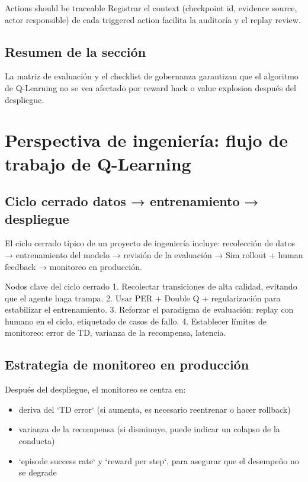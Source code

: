 \documentclass[a4paper]{article}
\begin{document}
\begin{knowledgebox}{Actions should be traceable}
Registrar el context (checkpoint id, evidence source, actor responsible) de cada triggered action facilita la auditoría y el replay review.
\end{knowledgebox}

\subsection{Resumen de la sección}

La matriz de evaluación y el checklist de gobernanza garantizan que el algoritmo de Q-Learning no se vea afectado por reward hack o value explosion después del despliegue.
\section{Perspectiva de ingeniería: flujo de trabajo de Q-Learning}

\subsection{Ciclo cerrado datos → entrenamiento → despliegue}

El ciclo cerrado típico de un proyecto de ingeniería incluye: recolección de datos → entrenamiento del modelo → revisión de la evaluación → Sim rollout + human feedback → monitoreo en producción.

\begin{importantbox}{Nodos clave del ciclo cerrado}
1. Recolectar transiciones de alta calidad, evitando que el agente haga trampa. 2. Usar PER + Double Q + regularización para estabilizar el entrenamiento. 3. Reforzar el paradigma de evaluación: replay con humano en el ciclo, etiquetado de casos de fallo. 4. Establecer límites de monitoreo: error de TD, varianza de la recompensa, latencia.
\end{importantbox}

\subsection{Estrategia de monitoreo en producción}

Después del despliegue, el monitoreo se centra en:

\begin{itemize}
    \item deriva del `TD error` (si aumenta, es necesario reentrenar o hacer rollback)
    \item varianza de la recompensa (si disminuye, puede indicar un colapso de la conducta)
    \item `episode success rate` y `reward per step`, para asegurar que el desempeño no se degrade
\end{itemize}
\end{document}
